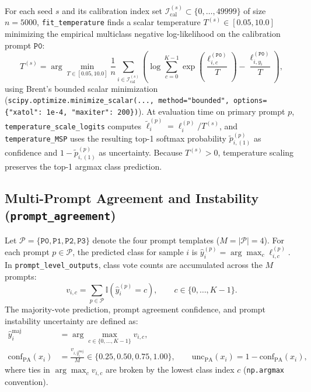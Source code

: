 \documentclass[11pt,a4paper]{article}
\begin{document}
For each seed $s$ and its calibration index set $\mathcal{I}_{\text{cal}}^{(s)} \subset \{0, \dots, 49999\}$ of size $n = 5000$, \texttt{fit\_\allowbreak{}temperature} finds a scalar temperature $T^{(s)} \in [0.05, 10.0]$ minimizing the empirical multiclass negative log-likelihood on the calibration prompt $\texttt{P0}$:
\begin{equation}
  T^{(s)} = \arg\min_{T \in [0.05, 10.0]} \frac{1}{n} \sum_{i \in \mathcal{I}_{\text{cal}}^{(s)}} \!\left( \log \sum_{c=0}^{K-1} \exp\!\left(\frac{\ell_{i,c}^{(\texttt{P0})}}{T}\right) - \frac{\ell_{i,y_i}^{(\texttt{P0})}}{T} \right),
\end{equation}
using Brent's bounded scalar minimization (\texttt{scipy.\allowbreak{}optimize.\allowbreak{}minimize\_scalar(.\allowbreak{}.\allowbreak{}.\allowbreak{}, method="bounded", options=\{"xatol": 1e-4, "maxiter": 200\})}). At evaluation time on primary prompt $p$, \texttt{temperature\_\allowbreak{}scale\_\allowbreak{}logits} computes $\tilde{\ell}_i^{(p)} = \ell_i^{(p)} / T^{(s)}$, and \texttt{temperature\_\allowbreak{}MSP} uses the resulting top-1 softmax probability $\tilde{p}_{i,(1)}^{(p)}$ as confidence and $1 - \tilde{p}_{i,(1)}^{(p)}$ as uncertainty. Because $T^{(s)} > 0$, temperature scaling preserves the top-1 argmax class prediction.

\subsection{Multi-Prompt Agreement and Instability (\texttt{prompt\_\allowbreak{}agreement})}

Let $\mathcal{P} = \{\texttt{P0}, \texttt{P1}, \texttt{P2}, \texttt{P3}\}$ denote the four prompt templates ($M = |\mathcal{P}| = 4$). For each prompt $p \in \mathcal{P}$, the predicted class for sample $i$ is $\hat{y}_i^{(p)} = \arg\max_{c} \ell_{i,c}^{(p)}$. In \texttt{prompt\_\allowbreak{}level\_\allowbreak{}outputs}, class vote counts are accumulated across the $M$ prompts:
\begin{equation}
  v_{i,c} = \sum_{p \in \mathcal{P}} \mathbb{I}\!\left(\hat{y}_i^{(p)} = c\right), \qquad c \in \{0, \dots, K-1\}.
\end{equation}
The majority-vote prediction, prompt agreement confidence, and prompt instability uncertainty are defined as:
\begin{equation}
\begin{aligned}
  \hat{y}_i^{\text{maj}} &= \arg\max_{c \in \{0,\dots,K-1\}} v_{i,c}, \\
  \text{conf}_{\text{PA}}(x_i) &= \frac{v_{i, \hat{y}_i^{\text{maj}}}}{M} \in \{0.25, 0.50, 0.75, 1.00\}, \qquad
  \text{unc}_{\text{PA}}(x_i) = 1 - \text{conf}_{\text{PA}}(x_i),
\end{aligned}
\end{equation}
where ties in $\arg\max_{c} v_{i,c}$ are broken by the lowest class index $c$ (\texttt{np.\allowbreak{}argmax} convention).
\end{document}
